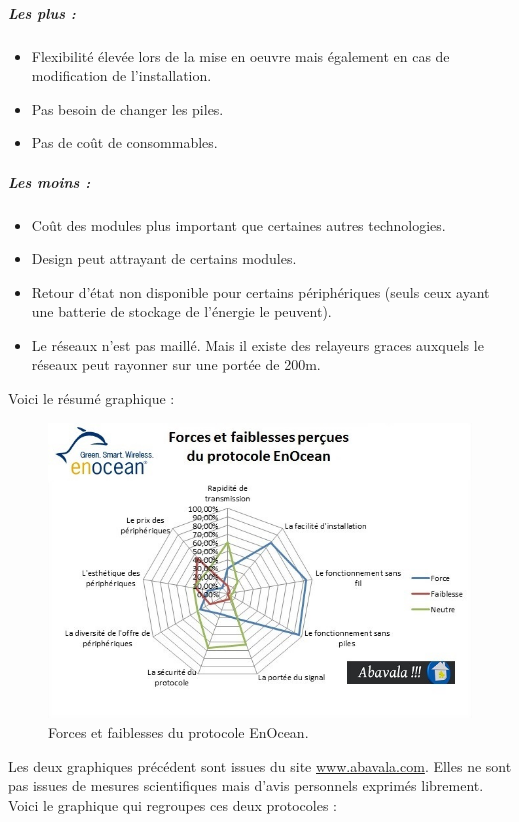 \documentclass[a4paper,10pt]{article}
\begin{document}
\subparagraph{Les plus :}
\begin{itemize}
\item Flexibilité élevée lors de la mise en oeuvre mais également en cas de modification de l'installation.
\item Pas besoin de changer les piles.
\item Pas de coût de consommables.
\end{itemize}
\subparagraph{Les moins :}
\begin{itemize}
\item Coût des modules plus important que certaines autres technologies.
\item Design peut attrayant de certains modules.
\item Retour d'état non disponible pour certains périphériques (seuls ceux ayant une batterie de stockage de l'énergie le peuvent).
\item Le réseaux n'est pas maillé. Mais il existe des relayeurs graces auxquels le réseaux peut rayonner sur une portée de 200m.\newline
\end{itemize}


Voici le résumé graphique :
\begin{figure}[H]
\centering\includegraphics[scale=0.7]{images/forces-protocole-enocean.jpg}
\caption{Forces et faiblesses du protocole EnOcean.}
\end{figure}

Les deux graphiques précédent sont issues du site \url{www.abavala.com}. Elles ne sont pas issues de mesures scientifiques mais d’avis personnels exprimés librement. Voici le graphique qui regroupes ces deux protocoles :
\end{document}
